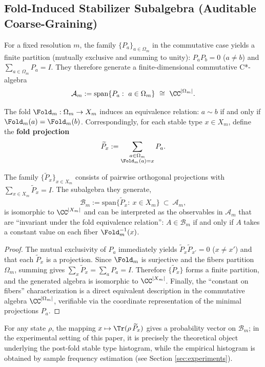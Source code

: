 \subsection{Fold-Induced Stabilizer Subalgebra (Auditable Coarse-Graining)}\label{app:op-algebra-fold-subalgebra}

For a fixed resolution $m$, the family $\{P_a\}_{a\in\Omega_m}$ in the commutative case yields a finite partition (mutually exclusive and summing to unity): $P_aP_b=0$ ($a\neq b$) and $\sum_{a\in\Omega_m}P_a=I$. They therefore generate a finite-dimensional commutative C*-algebra
\[
\mathcal{A}_m:=\mathrm{span}\{P_a:\ a\in\Omega_m\}\ \cong\ \CC^{|\Omega_m|}.
\]

The fold $\Fold_m:\Omega_m\to X_m$ induces an equivalence relation: $a\sim b$ if and only if $\Fold_m(a)=\Fold_m(b)$. Correspondingly, for each stable type $x\in X_m$, define the \textbf{fold projection}
\[
\widetilde P_x:=\sum_{\substack{a\in\Omega_m\\ \Fold_m(a)=x}} P_a.
\]

\begin{proposition}\label{prop:fold-invariant-subalgebra}
The family $\{\widetilde P_x\}_{x\in X_m}$ consists of pairwise orthogonal projections with $\sum_{x\in X_m}\widetilde P_x=I$. The subalgebra they generate,
\[
\mathcal{B}_m:=\mathrm{span}\{\widetilde P_x:\ x\in X_m\}\ \subset\ \mathcal{A}_m,
\]
is isomorphic to $\CC^{|X_m|}$ and can be interpreted as the observables in $\mathcal{A}_m$ that are ``invariant under the fold equivalence relation'': $A\in\mathcal{B}_m$ if and only if $A$ takes a constant value on each fiber $\Fold_m^{-1}(x)$.
\end{proposition}

\begin{proof}
The mutual exclusivity of $P_a$ immediately yields $\widetilde P_x\widetilde P_{x'}=0$ ($x\neq x'$) and that each $\widetilde P_x$ is a projection. Since $\Fold_m$ is surjective and the fibers partition $\Omega_m$, summing gives $\sum_{x}\widetilde P_x=\sum_{a}P_a=I$. Therefore $\{\widetilde P_x\}$ forms a finite partition, and the generated algebra is isomorphic to $\CC^{|X_m|}$. Finally, the ``constant on fibers'' characterization is a direct equivalent description in the commutative algebra $\CC^{|\Omega_m|}$, verifiable via the coordinate representation of the minimal projections $P_a$.
\end{proof}

\begin{remark}
For any state $\rho$, the mapping $x\mapsto \Tr(\rho\,\widetilde P_x)$ gives a probability vector on $\mathcal{B}_m$; in the experimental setting of this paper, it is precisely the theoretical object underlying the post-fold stable type histogram, while the empirical histogram is obtained by sample frequency estimation (see Section \ref{sec:experiments}).
\end{remark}

